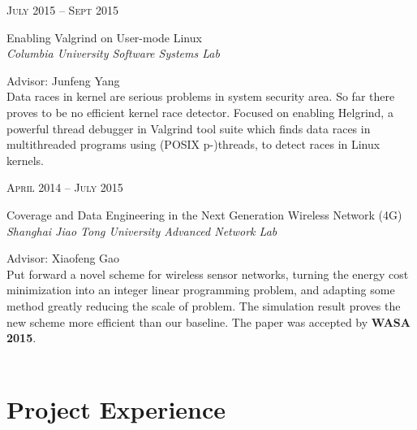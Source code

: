 \documentclass[10pt]{article} %
\begin{document}
{\begin{minipage}[t]{0.5\textwidth}

{\raggedleft\textsc{July 2015 -- Sept 2015}\par}

{\raggedright\large Enabling Valgrind on User-mode Linux\\
\textit{{\color{stress}Columbia University} Software Systems Lab}\\[5pt]}
Advisor: Junfeng Yang\\
\normalsize{Data races in kernel are serious problems in system security area. So far there proves to be no efficient kernel race detector. Focused on enabling Helgrind, a powerful thread debugger in Valgrind tool suite which finds data races in multithreaded programs using (POSIX p-)threads, to detect races in Linux kernels.}\\


{\raggedleft\textsc{April 2014 -- July 2015}\par}

{\raggedright\large Coverage and Data Engineering in the Next Generation Wireless Network (4G)\\
\textit{{\color{stress}Shanghai Jiao Tong University} Advanced Network Lab}\\[5pt]}
Advisor: Xiaofeng Gao\\
\normalsize{Put forward a novel scheme for wireless sensor networks, turning the energy cost minimization into an integer linear programming problem, and adapting some method greatly reducing the scale of problem. The simulation result proves the new scheme more efficient than our baseline. The paper was accepted by \textbf{WASA 2015}.}\\ \\


\section{Project Experience} 



\end{minipage}}
\end{document}
